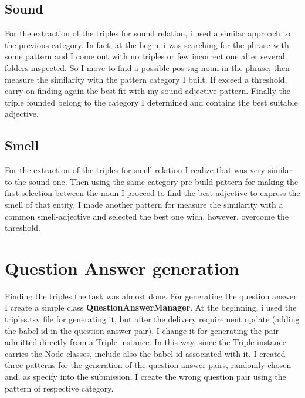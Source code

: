 \documentclass[conference,compsoc]{IEEEtran}
\begin{document}
\subsection{Sound}
For the extraction of the triples for sound relation, i used a similar approach to the previous category. In fact, at the begin, i was searching for the phrase with some pattern and I come out with no triples or few incorrect one after several folders inspected. So I move to find a possible pos tag noun in the phrase, then measure the similarity with the pattern category I built. If exceed a threshold, carry on finding again the best fit with my sound adjective pattern. Finally the triple founded belong to the category I determined and contains the best suitable adjective. \\

\subsection{Smell}
For the extraction of the triples for smell relation I realize that was very similar to the sound one. Then using the same category pre-build pattern for making the first selection between the noun I proceed to find the best adjective to express the smell of that entity. I made another pattern for measure the similarity with a common smell-adjective and selected the best one wich, however, overcome the threshold. \\

\section{Question Answer generation}
Finding the triples the task was almost done. For generating the question answer I create a simple class \textbf{QuestionAnswerManager}. At the beginning, i used the triples.tsv file for generating it, but after the delivery requirement update (adding the babel id in the question-answer pair), I change it for generating the pair admitted directly from a Triple instance. In this way, since the Triple instance carries the Node classes, include also the babel id associated with it. I created three patterns for the generation of the question-answer pairs, randomly chosen and, as specify into the submission, I create the wrong question pair using the pattern of respective category. 
\end{document}

